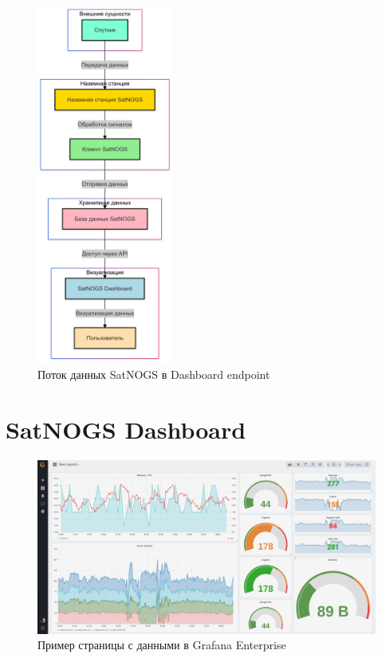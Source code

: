 \documentclass[14pt, a4paper]{bsu}
\begin{document}
\begin{figure}[htbp] \centering
	\includegraphics[width=0.4\textwidth]{satnogs_data_flow} \caption{Поток
		данных SatNOGS в Dashboard endpoint} \label{fig:satnogs_data_flow}
\end{figure}

\section{SatNOGS Dashboard}

\begin{figure}[htbp] \centering
	\includegraphics[width=1.0\textwidth]{grafana_example} \caption{Пример
		страницы с данными в Grafana Enterprise} \label{fig:grafana_example}
\end{figure}
\end{document}
